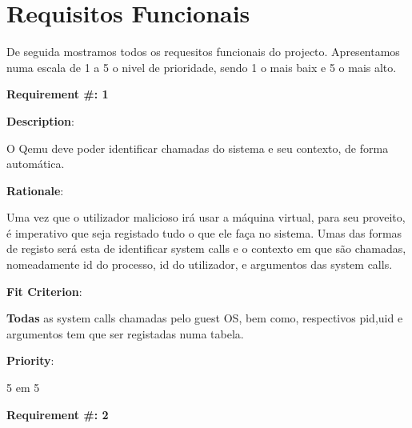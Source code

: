 \pagebreak
\section{Requisitos Funcionais}
De seguida mostramos todos os requesitos funcionais do projecto. Apresentamos numa escala de 1 a 5 o nivel de prioridade, sendo 1 o mais baix e 5 o mais alto.

\begin{minipage}{0.55\textwidth}
\begin{flushleft}\textbf{Requirement \#: 1}\end{flushleft}
\end{minipage}
\begin{minipage}{0.4\textwidth}
\end{minipage}

\begin{description}
\item \textbf{Description}:

O Qemu deve poder identificar chamadas do sistema e seu contexto, de forma automática. \\

\item \textbf{Rationale}:

Uma vez que o utilizador malicioso irá usar a máquina virtual, para seu proveito, é imperativo que seja registado
tudo o que ele faça no sistema. Umas das formas de registo será esta de identificar system calls e o contexto em que são chamadas,
nomeadamente id do processo, id do utilizador, e argumentos das system calls.

\item \textbf{Fit Criterion}:

\textbf{Todas} as system calls chamadas pelo guest OS, bem como, respectivos pid,uid e argumentos tem que ser registadas numa tabela. 

\item \textbf{Priority}:

5 em 5

\end{description}

\pagebreak













\begin{minipage}{0.55\textwidth}
\begin{flushleft}\textbf{Requirement \#: 2}\end{flushleft}
\end{minipage}
\begin{minipage}{0.4\textwidth}
\end{minipage}

